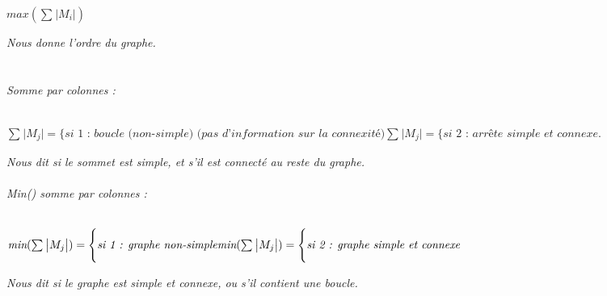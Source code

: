 \documentclass{article}
\begin{document}
\begin{center}
$max(\sum_{}\big|M_{i}\big|)$\\
\end{center}
\textit{Nous donne l'ordre du graphe.}\\\\\\
\textit{Somme par colonnes :}\\\\
\begin{center}
$\sum_{}\big|M_{j}\big| = \Bigg\{  \textit{si 1 : boucle (non-simple) (pas d'information sur la connexité)}
\sum_{}\big|M_{j}\big| = \Bigg\{  
\textit{si 2 : arrête simple et connexe} \big. $
\end{center}
\textit{Nous dit si le sommet est simple, et s'il est connecté au reste du graphe.}\\\\
\textit{Min() somme par colonnes :}\\\\
\begin{center}
$\textit{min}(\sum_{}\big|M_{j}\big|) = \Bigg\{  \textit{si 1 : graphe non-simple} 
\linebreak
\textit{min}(\sum_{}\big|M_{j}\big|) = \Bigg\{  
\textit{si 2 : graphe simple et connexe} \big. $
\end{center}
\textit{Nous dit si le graphe est simple et connexe, ou s'il contient une boucle.}\\\\
\end{document}
